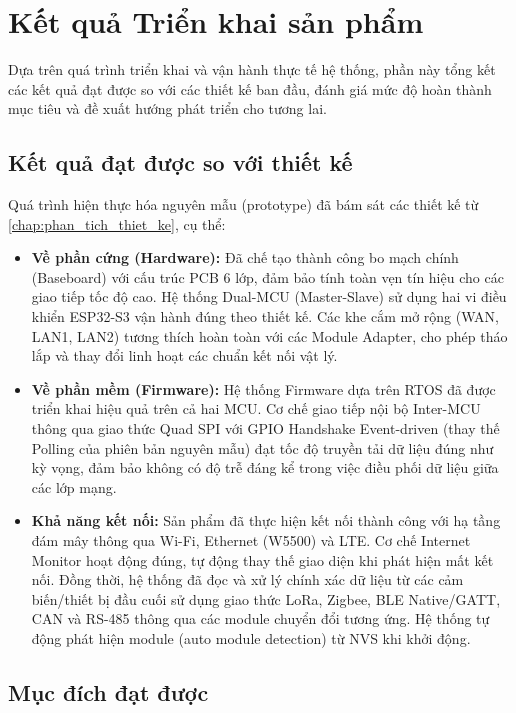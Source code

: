 \section{Kết quả Triển khai sản phẩm}

Dựa trên quá trình triển khai và vận hành thực tế hệ thống, phần này tổng kết các kết quả đạt được so với các thiết kế ban đầu, đánh giá mức độ hoàn thành mục tiêu và đề xuất hướng phát triển cho tương lai.

\subsection{Kết quả đạt được so với thiết kế}

Quá trình hiện thực hóa nguyên mẫu (prototype) đã bám sát các thiết kế từ \autoref{chap:phan_tich_thiet_ke}, cụ thể:

\begin{itemize}
    \item \textbf{Về phần cứng (Hardware):} Đã chế tạo thành công bo mạch chính (Baseboard) với cấu trúc PCB 6 lớp, đảm bảo tính toàn vẹn tín hiệu cho các giao tiếp tốc độ cao. Hệ thống Dual-MCU (Master-Slave) sử dụng hai vi điều khiển ESP32-S3 vận hành đúng theo thiết kế. Các khe cắm mở rộng (WAN, LAN1, LAN2) tương thích hoàn toàn với các Module Adapter, cho phép tháo lắp và thay đổi linh hoạt các chuẩn kết nối vật lý.
    \item \textbf{Về phần mềm (Firmware):} Hệ thống Firmware dựa trên RTOS đã được triển khai hiệu quả trên cả hai MCU. Cơ chế giao tiếp nội bộ Inter-MCU thông qua giao thức Quad SPI với GPIO Handshake Event-driven (thay thế Polling của phiên bản nguyên mẫu) đạt tốc độ truyền tải dữ liệu đúng như kỳ vọng, đảm bảo không có độ trễ đáng kể trong việc điều phối dữ liệu giữa các lớp mạng.
    \item \textbf{Khả năng kết nối:} Sản phẩm đã thực hiện kết nối thành công với hạ tầng đám mây thông qua Wi-Fi, Ethernet (W5500) và LTE. Cơ chế Internet Monitor hoạt động đúng, tự động thay thế giao diện khi phát hiện mất kết nối. Đồng thời, hệ thống đã đọc và xử lý chính xác dữ liệu từ các cảm biến/thiết bị đầu cuối sử dụng giao thức LoRa, Zigbee, BLE Native/GATT, CAN và RS-485 thông qua các module chuyển đổi tương ứng. Hệ thống tự động phát hiện module (auto module detection) từ NVS khi khởi động.
\end{itemize}

\subsection{Mục đích đạt được}

